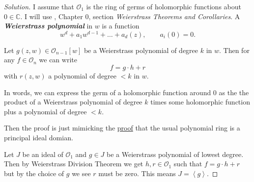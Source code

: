 \begin{proof}[Solution]\leavevmode
	I assume that $\mathcal{O}_1$ is the ring of germs of holomorphic functions about $0\in\mathbb{C}$. I will use \cite{gri}, Chapter 0, section \textit{Weierstrass Theorems and Corollaries}. A \textit{\textbf{Weierstrass polynomial}} in $w$ is a function
	\[w^d+a_1w^{d-1}+\ldots+a_d(z),\qquad a_i(0)=0.\]

\begin{thm}\leavevmode
	Let $g(z,w)\in\mathcal{O}_{n-1}[w]$ be a Weierstrass polynomial of degree $k$ in $w$. Then for any $f\in\mathcal{O}_n$ we can write
	\[f=g\cdot h+r\]
	with $r(z,w)$ a polynomial of degree $<k$ in $w$.
\end{thm}
In words, we can express the germ of a holomorphic function around 0 as the the product of a Weierstrass polynomial of degree $k$ times some holomorphic function plus a polynomial of degree $<k$.

Then the proof is just mimicking the \href{https://proofwiki.org/wiki/Polynomial_Forms_over_Field_form_Principal_Ideal_Domain}{proof} that the usual polynomial ring is a principal ideal domian.

Let $J$ be an ideal of $\mathcal{O}_1$ and $g\in J$ be a Weierstrass polynomial of lowest degree. Then by Weierstrass Division Theorem we get $h,r\in\mathcal{O}_1$ such that $f=g\cdot h+r$ but by the choice of $g$ we see $r$ must be zero. This means $J=\left<g\right> $.
\end{proof}

